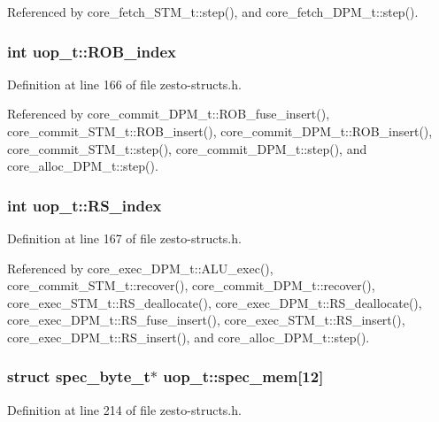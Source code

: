 Referenced by core\_\-fetch\_\-STM\_\-t::step(), and core\_\-fetch\_\-DPM\_\-t::step().
\subsubsection[{ROB\_\-index}]{\setlength{\rightskip}{0pt plus 5cm}int {\bf uop\_\-t::ROB\_\-index}}\label{structuop__t_e66802928ecce35d60f0495dee0a4ae7}




Definition at line 166 of file zesto-structs.h.

Referenced by core\_\-commit\_\-DPM\_\-t::ROB\_\-fuse\_\-insert(), core\_\-commit\_\-STM\_\-t::ROB\_\-insert(), core\_\-commit\_\-DPM\_\-t::ROB\_\-insert(), core\_\-commit\_\-STM\_\-t::step(), core\_\-commit\_\-DPM\_\-t::step(), and core\_\-alloc\_\-DPM\_\-t::step().
\subsubsection[{RS\_\-index}]{\setlength{\rightskip}{0pt plus 5cm}int {\bf uop\_\-t::RS\_\-index}}\label{structuop__t_8d3f920949e75a969f27530e48001e43}




Definition at line 167 of file zesto-structs.h.

Referenced by core\_\-exec\_\-DPM\_\-t::ALU\_\-exec(), core\_\-commit\_\-STM\_\-t::recover(), core\_\-commit\_\-DPM\_\-t::recover(), core\_\-exec\_\-STM\_\-t::RS\_\-deallocate(), core\_\-exec\_\-DPM\_\-t::RS\_\-deallocate(), core\_\-exec\_\-DPM\_\-t::RS\_\-fuse\_\-insert(), core\_\-exec\_\-STM\_\-t::RS\_\-insert(), core\_\-exec\_\-DPM\_\-t::RS\_\-insert(), and core\_\-alloc\_\-DPM\_\-t::step().
\subsubsection[{spec\_\-mem}]{\setlength{\rightskip}{0pt plus 5cm}struct {\bf spec\_\-byte\_\-t}$\ast$ {\bf uop\_\-t::spec\_\-mem}[12]\hspace{0.3cm}{\tt  [read]}}\label{structuop__t_faa3ffb8ea233ffb14b5a9ee855805ec}




Definition at line 214 of file zesto-structs.h.

